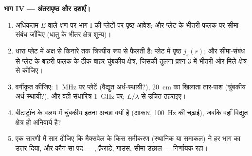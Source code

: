 \begin{problem}
\medskip
\noindent\textbf{भाग IV --- अंतरापृष्ठ और दशाएँ।}
\begin{enumerate}[resume]
  \item अधिकतम $E$ वाले क्षण पर भाग I की प्लेटों पर पृष्ठ आवेश;
        और प्लेट के भीतरी फलक पर सीमा-संबंध जाँचिए (धातु के भीतर
        क्षेत्र शून्य)।
  \item धारा प्लेट में अक्ष से किनारे तक त्रिज्यीय रूप से फैलती है:
        प्लेट में पृष्ठ  $j_s(r)$; और सीमा-संबंध से प्लेट के
        बाहरी फलक के ठीक बाहर चुंबकीय क्षेत्र, जिसकी तुलना प्रश्न 3 में
        भीतरी ओर मिले क्षेत्र से कीजिए।
  \item वर्गीकृत कीजिए: \qty{1}{MHz} पर प्लेटें (वैद्युत अर्ध-स्थायी?), \qty{20}{cm} का
        खिलाता तार-पाश (चुंबकीय अर्ध-स्थायी?), और वही संधारित्र
        \qty{1}{GHz} पर; $L/\lambda$ से उचित ठहराइए।
  \item बीटाट्रॉन के वलय में चुंबकीय 
        इतना अच्छा क्यों है (आकार, \qty{100}{Hz} की चढ़ाई), जबकि वहाँ
        विद्युत क्षेत्र ही अनिवार्य है?
  \item एक सारणी में सार दीजिए कि मैक्सवेल के किस समीकरण (स्थानिक या
        समाकल) ने हर भाग का उत्तर दिया, और कौन-सा पद --- , फ़ैराडे, गाउस, सीमा-उछाल --- निर्णायक रहा।
\end{enumerate}
\end{problem}
